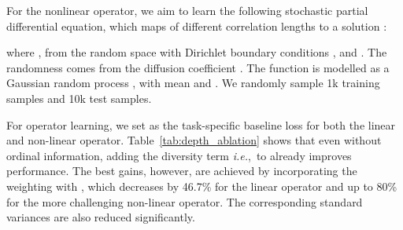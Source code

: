 \documentclass{article} \usepackage{iclr2023_conference,times}
\makeatletter
\newcommand*{\ie}{i.e.\@\xspace}
\def\ie{\mbox{\textit{i.e.}, }}
\makeatother
\begin{document}
For the nonlinear operator, we aim to learn the following {stochastic partial differential equation}, which maps  of different correlation lengths  to a solution :

where , 
 from the random space 
with Dirichlet boundary conditions , and . The randomness comes from the diffusion coefficient .  The function  is modelled as a Gaussian random process , with mean  and .
We randomly sample 1k training samples and 10k test samples.

\begin{table*}[t]
	\caption{Ablation studies on linear and nonlinear operators learning with synthetic data and depth estimation on NYU-Depth-v2. For operator learning, we report results as mean  standard variance over 10 runs. 
    \textbf{Bold} numbers indicate the best performance.}
	\label{tab:depth_ablation}
	\centering
\end{table*}

For operator learning, we set  as the task-specific baseline loss for both the linear and non-linear operator. Table~\ref{tab:depth_ablation} shows that even without ordinal information, adding the diversity term \ie  to   already improves performance.  The best gains, however, are achieved by incorporating the weighting with , which decreases  by 46.7\% for the linear operator and up to 80\% for the more challenging non-linear operator. The corresponding standard variances are also reduced significantly. 
\end{document}
